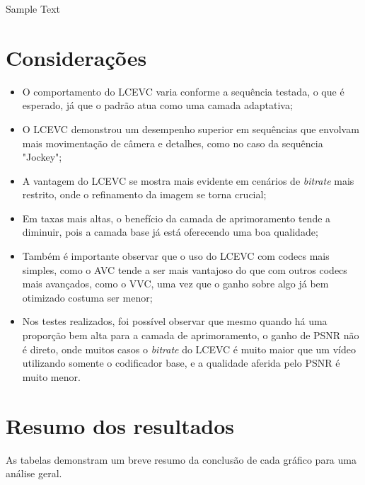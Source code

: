 Sample Text

\newpage

\section{Considerações}

\begin{itemize}
    \item O comportamento do \acrshort{LCEVC} varia conforme a sequência testada, o
    que é esperado, já que o padrão atua como uma camada adaptativa;

    \item O \acrshort{LCEVC} demonstrou um desempenho superior em sequências que
    envolvam mais movimentação de câmera e detalhes, como no caso da sequência "Jockey";
    
    \item A vantagem do \acrshort{LCEVC}  se mostra mais evidente em cenários de
    \textit{bitrate} mais restrito, onde o refinamento da imagem se torna crucial;


    \item Em taxas mais altas, o benefício da camada de aprimoramento tende a diminuir,
    pois a camada base já está oferecendo uma boa qualidade;

    \item Também é importante observar que o uso do \acrshort{LCEVC} com codecs mais
    simples, como o \acrshort{AVC} tende a ser mais vantajoso do que com outros codecs
    mais avançados, como o \acrshort{VVC}, uma vez que o ganho sobre algo já bem
    otimizado costuma ser menor;

    \item Nos testes realizados, foi possível observar que mesmo quando há uma proporção
    bem alta para a camada de aprimoramento, o ganho de \acrshort{PSNR} não é direto, onde
    muitos casos o \textit{bitrate} do \acrshort{LCEVC} é muito maior que um vídeo utilizando
    somente o codificador base, e a qualidade aferida pelo \acrshort{PSNR} é muito menor.
\end{itemize}

\newpage
\section{Resumo dos resultados}

As tabelas demonstram um breve resumo da conclusão de cada gráfico para uma análise 
geral.

